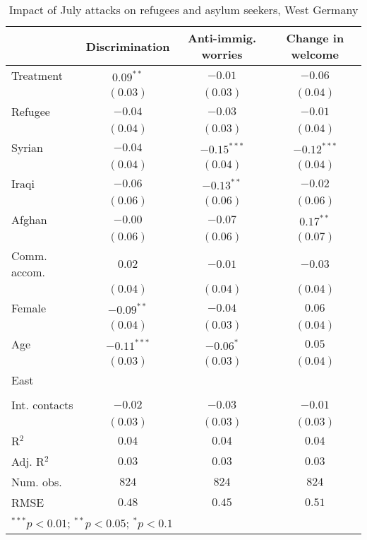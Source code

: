 
\begin{table}
\caption{Impact of July attacks on refugees and asylum seekers, West Germany}
\begin{center}
\begin{tabular}{l c c c}
\toprule
 & Discrimination & Anti-immig. worries & Change in welcome \\
\midrule
Treatment     & $0.09^{**}$   & $-0.01$       & $-0.06$       \\
              & $(0.03)$      & $(0.03)$      & $(0.04)$      \\
Refugee       & $-0.04$       & $-0.03$       & $-0.01$       \\
              & $(0.04)$      & $(0.03)$      & $(0.04)$      \\
Syrian        & $-0.04$       & $-0.15^{***}$ & $-0.12^{***}$ \\
              & $(0.04)$      & $(0.04)$      & $(0.04)$      \\
Iraqi         & $-0.06$       & $-0.13^{**}$  & $-0.02$       \\
              & $(0.06)$      & $(0.06)$      & $(0.06)$      \\
Afghan        & $-0.00$       & $-0.07$       & $0.17^{**}$   \\
              & $(0.06)$      & $(0.06)$      & $(0.07)$      \\
Comm. accom.  & $0.02$        & $-0.01$       & $-0.03$       \\
              & $(0.04)$      & $(0.04)$      & $(0.04)$      \\
Female        & $-0.09^{**}$  & $-0.04$       & $0.06$        \\
              & $(0.04)$      & $(0.03)$      & $(0.04)$      \\
Age           & $-0.11^{***}$ & $-0.06^{*}$   & $0.05$        \\
              & $(0.03)$      & $(0.03)$      & $(0.04)$      \\
East          &               &               &               \\
              &               &               &               \\
Int. contacts & $-0.02$       & $-0.03$       & $-0.01$       \\
              & $(0.03)$      & $(0.03)$      & $(0.03)$      \\
\midrule
R$^2$         & $0.04$        & $0.04$        & $0.04$        \\
Adj. R$^2$    & $0.03$        & $0.03$        & $0.03$        \\
Num. obs.     & $824$         & $824$         & $824$         \\
RMSE          & $0.48$        & $0.45$        & $0.51$        \\
\bottomrule
\multicolumn{4}{l}{\scriptsize{$^{***}p<0.01$; $^{**}p<0.05$; $^{*}p<0.1$}}
\end{tabular}
\label{tab_host_west}
\end{center}
\end{table}
